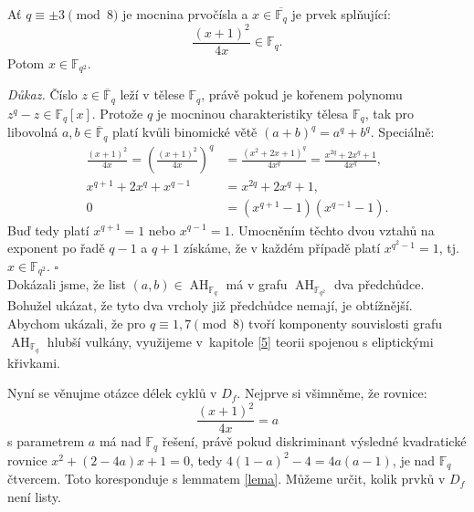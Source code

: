\documentclass[12pt]{report}
\DeclareMathOperator{\AH}{AH}
\begin{document}
\begin{veta}\label{lolol}
Ať $q \equiv \pm 3 \pmod{8}$ je mocnina prvočísla a $x \in \overline{\mathbb{F}_q}$ je prvek splňující:
$$\frac{(x+1)^2}{4x} \in \mathbb{F}_q.$$
Potom $x \in \mathbb{F}_{q^2}$.
\end{veta}
\noindent \textit{Důkaz.} Číslo $z \in \overline{\mathbb{F}}_q$ leží v tělese $\mathbb{F}_q$, právě pokud je kořenem polynomu $z^q - z \in \mathbb{F}_q [x]$. Protože $q$ je mocninou charakteristiky tělesa $\mathbb{F}_q$, tak pro libovolná $a,b \in \overline{\mathbb{F}}_q$ platí kvůli binomické větě $(a+b)^q = a^q + b^q$. Speciálně:
\begin{align*}
\frac{(x+1)^2}{4x} = \left( \frac{(x+1)^{2}}{4 x} \right)^{q} &= \frac{(x^2+2x+1)^{q}}{4 x^q} = \frac{x^{2q}+2 x^q + 1}{4 x^q},\\
x^{q+1} + 2 x^{q} + x^{q-1} &= x^{2q} + 2x^q + 1,\\
0 &= (x^{q+1} - 1)(x^{q-1} - 1).
\end{align*}
Buď tedy platí $x^{q+1} = 1$ nebo $x^{q-1}=1$. Umocněním těchto dvou vztahů na exponent po řadě $q-1$ a $q+1$ získáme, že v každém případě platí $x^{q^2-1}=1$, tj. $x \in \mathbb{F}_{q^2}$. \hfill $\square$\\


Dokázali jsme, že list $(a,b) \in \AH_{\mathbb{F}_q}$ má v grafu $\AH_{\mathbb{F}_{q^2}}$ dva předchůdce. Bohužel ukázat, že tyto dva vrcholy již předchůdce nemají, je obtížnější. Abychom ukázali, že pro $q \equiv 1,7 \pmod{8}$ tvoří komponenty souvislosti grafu $\AH_{\mathbb{F}_q}$ hlubší vulkány, využijeme v~kapitole \ref{5} teorii spojenou s eliptickými křivkami.

Nyní se věnujme otázce délek cyklů v $D_f$. Nejprve si všimněme, že rovnice: $$\frac{(x+1)^2}{4x} = a$$ s parametrem $a$ má nad $\mathbb{F}_q$ řešení, právě pokud diskriminant výsledné kvadratické rovnice $x^2 + (2-4a)x+1=0$, tedy $4(1-a)^2-4 = 4a(a-1)$, je nad $\mathbb{F}_q$ čtvercem. Toto koresponduje s lemmatem \ref{lema}. Můžeme určit, kolik prvků v $D_f$ není listy.



\end{document}

